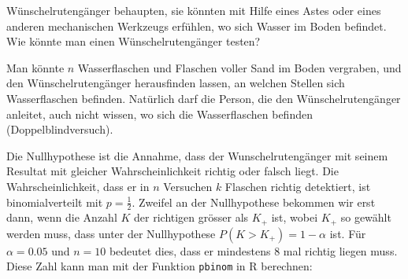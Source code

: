 Wünschelrutengänger behaupten, sie könnten mit Hilfe eines Astes
oder eines anderen mechanischen Werkzeugs erfühlen, wo sich Wasser
im Boden befindet. Wie könnte man einen Wünschelrutengänger testen?

\begin{loesung}
Man könnte $n$ Wasserflaschen und Flaschen voller Sand im Boden vergraben,
und den Wünschelrutengänger herausfinden lassen, an welchen Stellen
sich Wasserflaschen befinden. Natürlich darf die Person, die den
Wünschelrutengänger anleitet, auch nicht wissen, wo sich die
Wasserflaschen befinden (Doppelblindversuch).

Die Nullhypothese ist die Annahme, dass der Wunschelrutengänger mit
seinem Resultat mit
gleicher Wahrscheinlichkeit richtig oder falsch liegt.
Die Wahrscheinlichkeit, dass er  in $n$ Versuchen
$k$ Flaschen richtig detektiert, ist
binomialverteilt mit $p=\frac12$.
Zweifel an der Nullhypothese bekommen wir erst
dann, wenn die Anzahl $K$ der richtigen grösser als $K_+$ ist, wobei
$K_+$ so gewählt werden muss, dass unter der Nullhypothese
$P(K>K_+)=1-\alpha$ ist. Für $\alpha=0.05$ und $n=10$ bedeutet
dies, dass er mindestens 8 mal richtig liegen muss. Diese Zahl
kann man mit der Funktion {\tt pbinom} in R berechnen:
\end{loesung}

